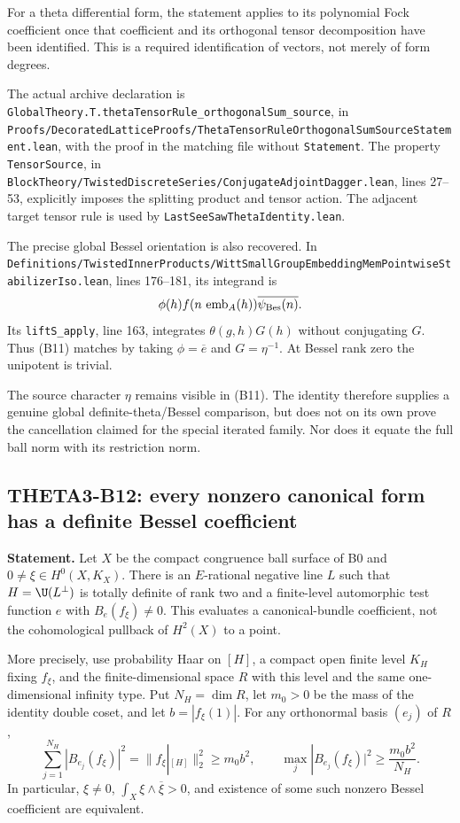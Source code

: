 For a theta differential form, the statement applies to its polynomial Fock coefficient once that coefficient and its orthogonal tensor decomposition have been identified. This is a required identification of vectors, not merely of form degrees.

The actual archive declaration is
\texttt{GlobalTheory.T.thetaTensorRule\_orthogonalSum\_source}, in
\texttt{Proofs/\allowbreak{}DecoratedLatticeProofs/\allowbreak{}ThetaTensorRuleOrthogonalSumSourceStatement.lean}, with the proof in the matching file without \texttt{Statement}. The property \texttt{TensorSource}, in \texttt{BlockTheory/\allowbreak{}TwistedDiscreteSeries/\allowbreak{}ConjugateAdjointDagger.lean}, lines 27--53, explicitly imposes the splitting product and tensor action. The adjacent target tensor rule is used by \texttt{LastSeeSawThetaIdentity.lean}.

The precise global Bessel orientation is also recovered. In
\texttt{Definitions/\allowbreak{}TwistedInnerProducts/\allowbreak{}WittSmallGroupEmbeddingMemPointwiseStabilizerIso.lean}, lines 176--181, its integrand is
\[
 \phi(h)f(n\,\operatorname{emb}_A(h))\overline{\psi_{\rm Bes}(n)}.
\]
Its \texttt{liftS\_apply}, line 163, integrates $\theta(g,h)G(h)$ without conjugating $G$. Thus (B11) matches by taking $\phi=\overline e$ and $G=\eta^{-1}$. At Bessel rank zero the unipotent is trivial.

The source character $\eta$ remains visible in (B11). The identity therefore supplies a genuine global definite-theta/Bessel comparison, but does not on its own prove the cancellation claimed for the special iterated family. Nor does it equate the full ball norm with its restriction norm.

\subsection{THETA3-B12: every nonzero canonical form has a definite Bessel coefficient}\label{B12}

\textbf{Statement.} Let $X$ be the compact congruence ball surface of B0 and $0\ne\xi\in H^0(X,K_X)$. There is an $E$-rational negative line $L$ such that $H=\U(L^\perp)$ is totally definite of rank two and a finite-level automorphic test function $e$ with $B_e(f_\xi)\ne0$. This evaluates a canonical-bundle coefficient, not the cohomological pullback of $H^2(X)$ to a point.

More precisely, use probability Haar on $[H]$, a compact open finite level $K_H$ fixing $f_\xi$, and the finite-dimensional space $R$ with this level and the same one-dimensional infinity type. Put $N_H=\dim R$, let $m_0>0$ be the mass of the identity double coset, and let $b=|f_\xi(1)|$. For any orthonormal basis $(e_j)$ of $R$,
\[
 \sum_{j=1}^{N_H}|B_{e_j}(f_\xi)|^2
      =\|f_\xi|_{[H]}\|_2^2\geq m_0b^2,
 \qquad
 \max_j|B_{e_j}(f_\xi)|^2\geq\frac{m_0b^2}{N_H}.
 \tag{B12}
\]
In particular, $\xi\ne0$, $\int_X\xi\wedge\overline\xi>0$, and existence of some such nonzero Bessel coefficient are equivalent.


